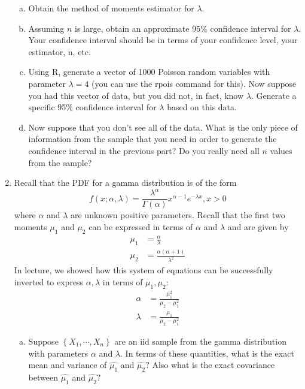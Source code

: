 \documentclass{article}
\begin{document}
\begin{enumerate}
\begin{enumerate}[(a)]
			\item Obtain the method of moments estimator for $\lambda.$

			\item Assuming $n$ is large, obtain an approximate 95\% confidence interval for $\lambda.$ Your confidence interval should be in terms of your confidence level, your estimator, n, etc.

			\item Using R, generate a vector of 1000 Poisson random variables with parameter $\lambda=4$ (you can use the rpois command for this). Now suppose you had this vector of data, but you did not, in fact, know $\lambda.$ Generate a specific 95\% confidence interval for $\lambda$ based on this data.

			\item Now suppose that you don't see all of the data. What is the only piece of information from the sample that you need in order to generate the confidence interval in the previous part? Do you really need all $n$ values from the sample?
				
		\end{enumerate}

	\item Recall that the PDF for a gamma distribution is of the form \[f(x; \alpha, \lambda)=\frac{\lambda^{\alpha}}{\Gamma(\alpha)}x^{\alpha-1}e^{-\lambda x}, x>0\] where $\alpha$ and $\lambda$ are unknown positive parameters. Recall that the first two moments $\mu_1$ and $\mu_2$ can be expressed in terms of $\alpha$ and $\lambda$ and are given by 
		\begin{align*}
			\mu_1 &= \frac{\alpha}{\lambda} \\
			\mu_2 &= \frac{\alpha(\alpha+1)}{\lambda^2}
		\end{align*}
		In lecture, we showed how this system of equations can be successfully inverted to express $\alpha, \lambda$ in terms of $\mu_1, \mu_2:$ 
		\begin{align*}
			\alpha &= \frac{\mu_1^2}{\mu_2-\mu_1^2} \\
			\lambda &= \frac{\mu_1}{\mu_2-\mu_1^2}
		\end{align*}
		
		\begin{enumerate}[(a)]
			\item Suppose $\left\{ X_1, \cdots, X_n \right\}$ are an iid sample from the gamma distribution with parameters $\alpha$ and $\lambda.$ In terms of these quantities, what is the exact mean and variance of $\hat{\mu_1}$ and $\hat{\mu_2}?$ Also what is the exact covariance between $\hat{\mu_1}$ and $\hat{\mu_2}?$


\end{enumerate}
\end{enumerate}
\end{document}
